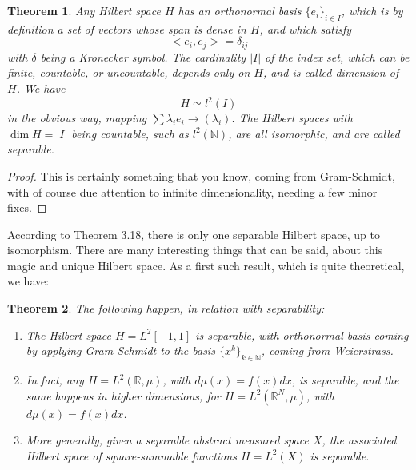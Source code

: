 \documentclass[12pt]{amsbook}
\newtheorem{theorem}{Theorem}[chapter]
\begin{document}
\begin{theorem}
Any Hilbert space $H$ has an orthonormal basis $\{e_i\}_{i\in I}$, which is by definition a set of vectors whose span is dense in $H$, and which satisfy
$$<e_i,e_j>=\delta_{ij}$$
with $\delta$ being a Kronecker symbol. The cardinality $|I|$ of the index set, which can be finite, countable, or uncountable, depends only on $H$, and is called dimension of $H$. We have
$$H\simeq l^2(I)$$
in the obvious way, mapping $\sum\lambda_ie_i\to(\lambda_i)$. The Hilbert spaces with $\dim H=|I|$ being countable, such as $l^2(\mathbb N)$, are all isomorphic, and are called separable.
\end{theorem}

\begin{proof}
This is certainly something that you know, coming from Gram-Schmidt, with of course due attention to infinite dimensionality, needing a few minor fixes.
\end{proof}

According to Theorem 3.18, there is only one separable Hilbert space, up to isomorphism. There are many interesting things that can be said, about this magic and unique Hilbert space. As a first such result, which is quite theoretical, we have:


\begin{theorem}
The following happen, in relation with separability:
\begin{enumerate}
\item The Hilbert space $H=L^2[-1,1]$ is separable, with orthonormal basis coming by applying Gram-Schmidt to the basis $\{x^k\}_{k\in\mathbb N}$, coming from Weierstrass.

\item In fact, any $H=L^2(\mathbb R,\mu)$, with $d\mu(x)=f(x)dx$, is separable, and the same happens in higher dimensions, for $H=L^2(\mathbb R^N,\mu)$, with $d\mu(x)=f(x)dx$.

\item More generally, given a separable abstract measured space $X$, the associated Hilbert space of square-summable functions $H=L^2(X)$ is separable.
\end{enumerate}
\end{theorem}
 
\end{document}
